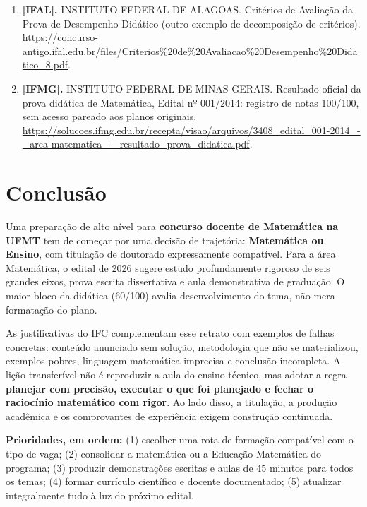 \documentclass[11pt,a4paper]{article}
\begin{document}
\begin{enumerate}
\item \textbf{[IFAL].} INSTITUTO FEDERAL DE ALAGOAS. Critérios de Avaliação da Prova de Desempenho Didático (outro exemplo de decomposição de critérios). \url{https://concurso-antigo.ifal.edu.br/files/Criterios%20de%20Avaliacao%20Desempenho%20Didatico_8.pdf}.
\item \textbf{[IFMG].} INSTITUTO FEDERAL DE MINAS GERAIS. Resultado oficial da prova didática de Matemática, Edital nº 001/2014: registro de notas 100/100, sem acesso pareado aos planos originais. \url{https://solucoes.ifmg.edu.br/recepta/visao/arquivos/3408_edital_001-2014_-_area-matematica_-_resultado_prova_didatica.pdf}.
\end{enumerate}
\normalsize

\section*{Conclusão}
Uma preparação de alto nível para \textbf{concurso docente de Matemática na UFMT} tem de começar por uma decisão de trajetória: \textbf{Matemática ou Ensino}, com titulação de doutorado expressamente compatível. Para a área Matemática, o edital de 2026 sugere estudo profundamente rigoroso de seis grandes eixos, prova escrita dissertativa e aula demonstrativa de graduação. O maior bloco da didática (60/100) avalia desenvolvimento do tema, não mera formatação do plano.

As justificativas do IFC complementam esse retrato com exemplos de falhas concretas: conteúdo anunciado sem solução, metodologia que não se materializou, exemplos pobres, linguagem matemática imprecisa e conclusão incompleta. A lição transferível não é reproduzir a aula do ensino técnico, mas adotar a regra \textbf{planejar com precisão, executar o que foi planejado e fechar o raciocínio matemático com rigor}. Ao lado disso, a titulação, a produção acadêmica e os comprovantes de experiência exigem construção continuada.

\begin{ideia}
\textbf{Prioridades, em ordem:} (1) escolher uma rota de formação compatível com o tipo de vaga; (2) consolidar a matemática ou a Educação Matemática do programa; (3) produzir demonstrações escritas e aulas de 45 minutos para todos os temas; (4) formar currículo científico e docente documentado; (5) atualizar integralmente tudo à luz do próximo edital.
\end{ideia}
\end{document}
